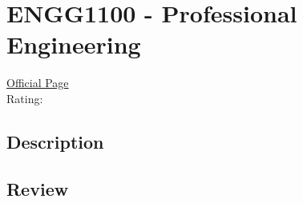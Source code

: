 \hypertarget{ENGG1100}{\section{ENGG1100 - Professional Engineering}}

\large
\textcolor{turbo_purple}{\href{https://my.uq.edu.au/programs-courses/course.html?course_code=ENGG1100}{Official Page}} \\
Rating: \cstar\cstar\cstar\cstar\ostar \\

\normalsize
\subsection{Description}

\subsection{Review}

